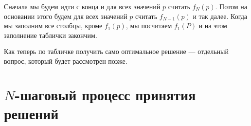 Сначала мы будем идти с конца и для всех значений $p$ считать $f_N(p)$. Потом на основании этого будем для всех значений $p$ считать $f_{N-1}(p)$ и так далее. Когда мы заполним все столбцы, кроме $f_1(p)$, мы посчитаем $f_1(P)$ и на этом заполнение таблички закончим.

Как теперь по табличке получить само оптимальное решение --- отдельный вопрос, который будет рассмотрен позже.

\section{$N$-шаговый процесс принятия решений}
